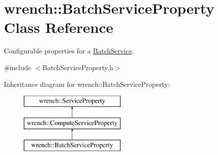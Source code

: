 \hypertarget{classwrench_1_1_batch_service_property}{}\section{wrench\+:\+:Batch\+Service\+Property Class Reference}
\label{classwrench_1_1_batch_service_property}


Configurable properties for a \hyperlink{classwrench_1_1_batch_service}{Batch\+Service}.  




{\ttfamily \#include $<$Batch\+Service\+Property.\+h$>$}

Inheritance diagram for wrench\+:\+:Batch\+Service\+Property\+:\begin{figure}[H]
\begin{center}
\leavevmode
\includegraphics[height=3.000000cm]{classwrench_1_1_batch_service_property}
\end{center}
\end{figure}
